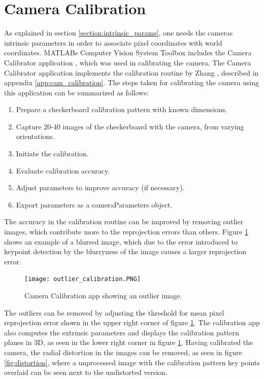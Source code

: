 \section{Camera Calibration}
\label{section:matlab_calibration}
As explained in section \ref{section:intrinsic_params}, one needs the cameras intrinsic parameters in order to associate pixel coordinates with world coordinates. MATLABs Computer Vision System Toolbox includes the Camera Calibrator application \cite{camera_calibrator}, which was used in calibrating the camera. The Camera Calibrator application implements the calibration routine by Zhang \cite{flexCal}, described in appendix \ref{app:cam_calibration}. The steps taken for calibrating the camera using this application can be summarized as follows:
\begin{enumerate}
	\item Prepare a checkerboard calibration pattern with known dimensions.
	\item Capture 20-40 images of the checkerboard with the camera, from varying orientations.
	\item Initiate the calibration.
	\item Evaluate calibration accuracy.
	\item Adjust parameters to improve accuracy (if necessary).
	\item Export parameters as a cameraParameters object.
\end{enumerate}
The accuracy in the calibration routine can be improved by removing outlier images, which contribute more to the reprojection errors than others. Figure \ref{fig:calib_outlier} shows an example of a blurred image, which due to the error introduced to keypoint detection by the blurryness of the image causes a larger reprojection error.
\begin{figure}[H]
	\centering
	\texttt{[image: outlier\_calibration.PNG]}
	\caption{Camera Calibration app showing an outlier image.}
	\label{fig:calib_outlier}
\end{figure}
The outliers can be removed by adjusting the threshold for mean pixel reprojection error shown in the upper right corner of figure \ref{fig:calib_outlier}. The calibration app also computes the extrinsic parameters and displays the calibration pattern planes in 3D, as seen in the lower right corner in figure \ref{fig:calib_outlier}.
Having calibrated the camera, the radial distortion in the images can be removed, as seen in figure \ref{fig:distortion}, where a unprocessed image with the calibration pattern key points overlaid can be seen next to the undistorted version.
